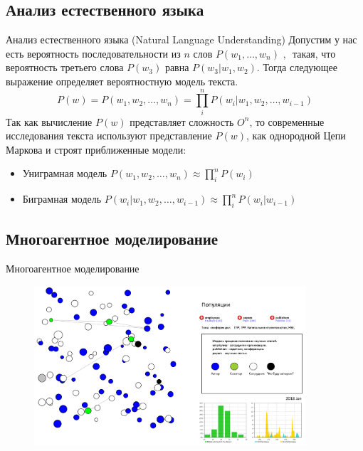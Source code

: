 \documentclass{beamer}
\begin{document}
\subsection{Анализ естественного языка}
\begin{frame}{Анализ естественного языка (Natural Language Understanding)}
Допустим у нас есть вероятность последовательности из $n$ слов $ P(w_1, \dots, w_n)\mbox{ , }$ такая, что вероятность третьего слова $P(w_3) $ равна $P(w_3|w_1,w_2)$. 
Тогда следующее выражение определяет вероятностную модель текста. 
\begin{equation}
	P ( w ) = P( w_1, w_2, \dots , w_n ) =  \prod_i^n P( w_i | w_1, w_2, \dots , w_{i-1} )
\end{equation}
Так как вычисление $P (w) $ представляет сложность $O^n$, то современные исследования текста используют представление $P ( w )$, как однородной Цепи Маркова и строят приближенные модели: 

\begin{itemize}
	\item Униграмная модель $ P(w_1, w_2, \dots , w_n )  \approx \prod_i^n P(w_i)$
	\item Биграмная модель $ P(w_i \vert w_1, w_2, \dots , w_{i-1} )  \approx  \prod_i^n  P(w_i \vert w_{i-1} )$
\end{itemize}

\end{frame}

\subsection{Многоагентное моделирование}
\begin{frame}{Многоагентное моделирование}
	\begin{figure}[ht]
		\centering
		\includegraphics[width=0.9\textwidth]{media/so1}
	\end{figure}  
\end{frame}
\end{document}
